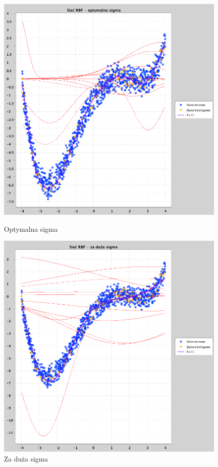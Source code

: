 \documentclass[a4paper, portrait,11pt]{article}
\begin{document}
\begin{figure}[!htb]
\begin{minipage}{0.33\textwidth}
    \includegraphics[width=1\linewidth]{../data/approximation3/2/derivatives/optimal.png}
    \caption{\label{fig:2optimalderivative}Optymalna sigma}
  \end{minipage}
  \begin{minipage}{0.33\textwidth}
    \centering
    \includegraphics[width=1\linewidth]{../data/approximation3/2/derivatives/big.png}
    \caption{\label{fig:2bigderivative}Za duża sigma}
  \end{minipage}\hfill
\end{figure}
\end{document}
